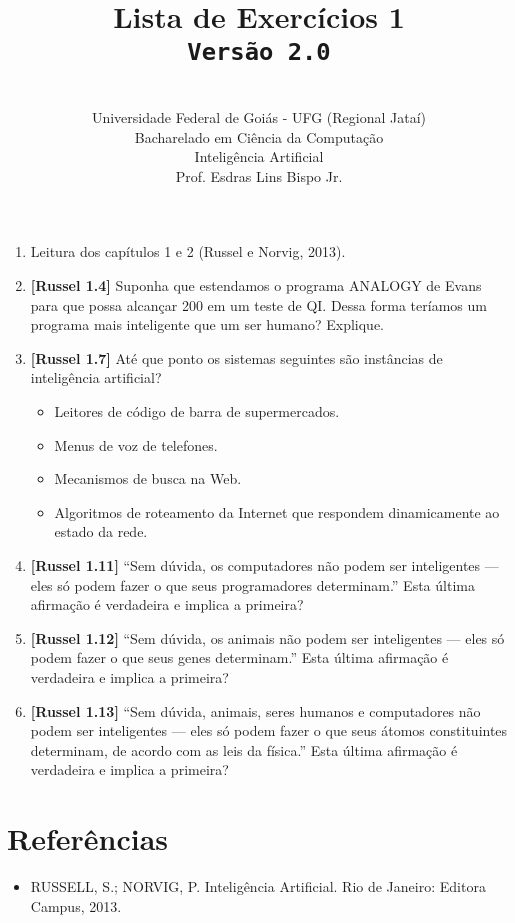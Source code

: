 \documentclass[12pt,a4paper,oneside]{article}
\author{\\Universidade Federal de Goiás - UFG (Regional Jataí) \\Bacharelado em Ciência da Computação \\Inteligência Artificial \\Prof. Esdras Lins Bispo Jr.}
\title{
	{\sc \huge Lista de Exercícios 1} 
	\\{\tt Versão 2.0}
}
\begin{document}
\maketitle

\begin{enumerate}

	\item Leitura dos capítulos 1 e 2 (Russel e Norvig, 2013).
	
	\item {\bf [Russel 1.4]} Suponha que estendamos o programa ANALOGY de Evans para que possa alcançar 200 em um
teste de QI. Dessa forma teríamos um programa mais inteligente que um ser humano? Explique.	

	\item {\bf [Russel 1.7]} Até que ponto os sistemas seguintes são instâncias de inteligência artificial?
 		\begin{itemize}
 			\item Leitores de código de barra de supermercados.
			\item Menus de voz de telefones.
			\item Mecanismos de busca na Web.
			\item Algoritmos de roteamento da Internet que respondem dinamicamente ao estado da rede.
		\end{itemize}
	
	\item {\bf [Russel 1.11]} ``Sem dúvida, os computadores não podem ser inteligentes — eles só podem fazer o que seus programadores determinam.'' Esta última afirmação é verdadeira e implica a primeira?
	
	\item {\bf [Russel 1.12]} ``Sem dúvida, os animais não podem ser inteligentes — eles só podem fazer o que seus genes determinam.'' Esta última afirmação é verdadeira e implica a primeira?
	
	\item {\bf [Russel 1.13]} ``Sem dúvida, animais, seres humanos e computadores não podem ser inteligentes — eles só podem fazer o que seus átomos constituintes determinam, de acordo com as leis da física.'' Esta
última afirmação é verdadeira e implica a primeira?	
		
\end{enumerate}

\section{Referências}

\begin{itemize}
	\item RUSSELL, S.; NORVIG, P. Inteligência Artificial. Rio de Janeiro: Editora Campus, 2013.
\end{itemize}
\end{document}
